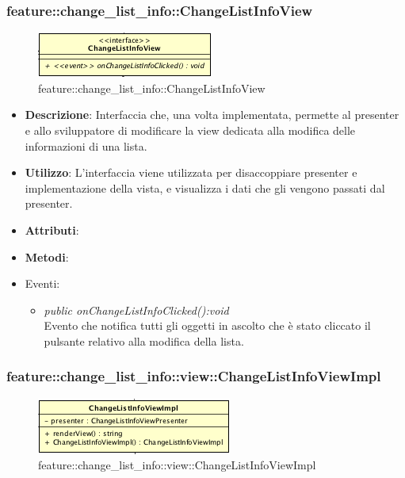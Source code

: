 \subsubsection{feature::change\_list\_info::ChangeListInfoView}

\label{feature::change_list_info::ChangeListInfoView}
\begin{figure}[H]
	\centering
	\includegraphics[scale=0.5]{Sezioni/SottosezioniST/img/app/ChangeListInfoView.png}
	\caption{feature::change\_list\_info::ChangeListInfoView}
\end{figure}

\begin{itemize}
\item \textbf{Descrizione}: Interfaccia che, una volta implementata, permette al presenter e allo sviluppatore di modificare la view dedicata alla modifica delle informazioni di una lista.
\item \textbf{Utilizzo}: L'interfaccia viene utilizzata per disaccoppiare presenter e implementazione della vista, e visualizza i dati che gli vengono passati dal presenter.
\item \textbf{Attributi}: 
\item \textbf{Metodi}:
\item{Eventi}:
	\begin{itemize}	
	\item \textit{public onChangeListInfoClicked():void}\\
		Evento che notifica tutti gli oggetti in ascolto che è stato cliccato il pulsante relativo alla modifica della lista.
	\end{itemize}
\end{itemize}

\subsubsection{feature::change\_list\_info::view::ChangeListInfoViewImpl}

\label{feature::change_list_info::view::ChangeListInfoViewImpl}
\begin{figure}[H]
	\centering
	\includegraphics[scale=0.5]{Sezioni/SottosezioniST/img/app/ChangeListInfoViewImpl.png}
	\caption{feature::change\_list\_info::view::ChangeListInfoViewImpl}
\end{figure}


